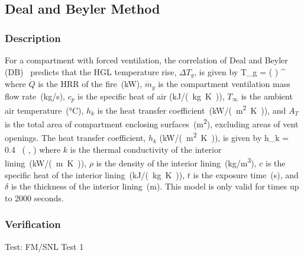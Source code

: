 \clearpage


\subsection{Deal and Beyler Method}

\subsubsection*{Description}

For a compartment with forced ventilation, the correlation of Deal and Beyler (DB)~\cite{SFPE:Walton} predicts that the HGL temperature rise, $\Delta T_g$, is given by
\be
\Delta T_g = \left(  \right) \quad ^
\label{eq:DB}
\ee
where $\dot Q$ is the HRR of the fire~(\si{kW}), $\dot m_g$ is the compartment ventilation mass flow rate~(\si{kg/s}), $c_p$ is the specific heat of air (\si{kJ/(kg.K)}), $T_\infty$ is the ambient air temperature~(\si{\celsius}), $h_k$ is the heat transfer coefficient~(\si{kW/(m^2.K)}), and $A_T$ is the total area of compartment enclosing surfaces~(\si{m^2}), excluding areas of vent openings. The heat transfer coefficient, $h_k$ (\si{kW/(m^2.K)}), is given by 
\be
h_k = 0.4\  \left(  ,  \right)
\label{eq:DB_hk}
\ee
where $k$ is the thermal conductivity of the interior lining~(\si{kW/(m.K)}), $\rho$ is the density of the interior lining~(\si{kg/m^3}), $c$ is the specific heat of the interior lining~(\si{kJ/(kg.K)}), $t$ is the exposure time~(\si{\second}), and $\delta$ is the thickness of the interior lining~(\si{m}). This model is only valid for times up to 2000 seconds.

\subsubsection*{Verification}

Test: FM/SNL Test 1

